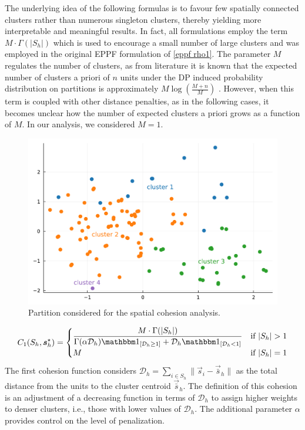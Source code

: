 \documentclass[12pt,	%
	a4paper,		%
	twoside,		%
	openright,		%
	titlepage,%
	]{book}
\theoremstyle{definition}
\let\cite\citep
\begin{document}
The underlying idea of the following formulas is to favour few spatially connected clusters rather than numerous singleton clusters, thereby yielding more interpretable and meaningful results. In fact, all formulations employ the term $M \cdot \Gamma(|S_h|)$ which is used to encourage a small number of large clusters \cite{paper-3} and was employed in the original EPPF formulation of \eqref{eppf rho1}. The parameter $M$ regulates the number of clusters, as from literature it is known that the expected number of clusters a priori of $n$ units under the DP induced probability distribution on partitions is approximately $M \log(\frac{M+n}{M})$ \cite{paper-3}. However, when this term is coupled with other distance penalties, as in the following cases, it becomes unclear how the number of expected clusters a priori grows as a function of $M$. In our analysis, we considered $M=1$.


\begin{figure}[!ht]
    \centering
    \includegraphics[width=1\linewidth]{model description/new space plots/cohesions_test.pdf}
    \caption[Partition considered for the spatial cohesion analysis]{Partition considered for the spatial cohesion analysis.}
    \label{fig: cohesions_test}
\end{figure}


\begin{equation}    
C_1(S_{h},\vec{s}_{h}^\star) = \begin{cases}
    \dfrac{M \cdot \Gamma(|S_h|)}{\Gamma(\alpha \mathcal{D}_h) \indicator{\mathcal{D}_h\geq 1} + \mathcal{D}_h \indicator{\mathcal{D}_h<1}} & \text{if } |S_h| > 1\\ 
   \hfil M & \text{if } |S_h| = 1
\end{cases}
\end{equation}
The first cohesion function \cite{cohesion1-denison} considers $\mathcal{D}_h = \sum_{i \in S_h} \| \vec{s}_i - \vec{\bar s}_h\|$ as the total distance from the units to the cluster centroid $\vec{\bar s}_h$. The definition of this cohesion is an adjustment of a decreasing function in terms of $\mathcal{D}_h$ to assign higher weights to denser clusters, i.e., those with lower values of $\mathcal{D}_h$. The additional parameter $\alpha$ provides control on the level of penalization.
\end{document}
